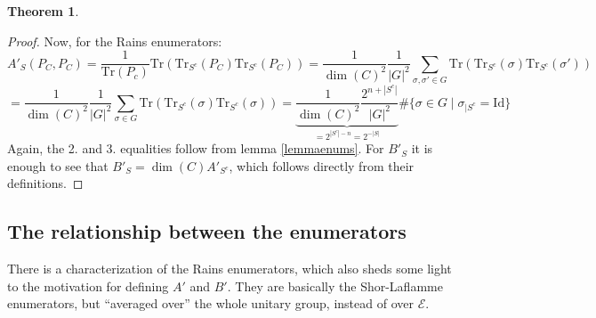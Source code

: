 \documentclass{article}
\def\E{\mathcal{E}}
\def\Tr{\text{Tr}}
\def\Id{\text{Id}}
\theoremstyle{definition}
\newtheorem{theorem}[Satz]{Theorem}
\begin{document}
\begin{theorem}
\begin{proof}
Now, for the Rains enumerators: 
\begin{equation} A'_S(P_C,P_C) = \frac{1}{\Tr(P_c)} \Tr(\Tr_{S^c}(P_C)\Tr_{S^c}(P_C)) = \frac{1}{\dim (C)^2} \frac{1}{|G|^2} \sum_{\sigma, \sigma' \in G}  \Tr(\Tr_{S^c}(\sigma)\Tr_{S^c}(\sigma')) \end{equation}
\begin{equation} = \frac{1}{\dim (C)^2} \frac{1}{|G|^2} \sum_{\sigma \in G}  \Tr(\Tr_{S^c}(\sigma)\Tr_{S^c}(\sigma)) = \underbrace{\frac{1}{\dim (C)^2} \frac{2^{n+|S^c|}}{|G|^2}}_{= 2^{|S^c| - n}=2^{-|S|}} \# \{ \sigma \in G \mid \sigma_{\big| S^c} = \Id \} \end{equation}
Again, the 2. and 3. equalities follow from lemma \ref{lemmaenums}. For $B'_S$ it is enough to see that $B'_{S} = \dim (C) A'_{S^c}$, which follows directly from their definitions.
\end{proof}

\end{theorem}

\subsection{The relationship between the enumerators}

There is a characterization of the Rains enumerators, which also sheds some light to the motivation for defining $A'$ and $B'$. 
They are basically the Shor-Laflamme enumerators, but ``averaged over'' the whole unitary group, instead of over $\E$.
\end{document}
